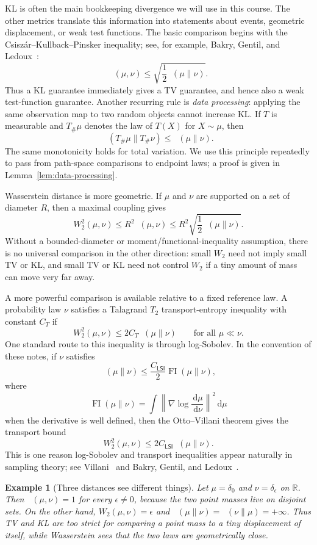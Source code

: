 \documentclass[10pt,a4paper]{amsart}
\numberwithin{equation}{section}
\newtheorem*{example}{Example}
\DeclareMathOperator{\KL}{D_{\mathsf{KL}}}
\DeclareMathOperator{\TV}{D_{\mathsf{TV}}}
\DeclareMathOperator{\FI}{FI}
\newcommand{\R}{\mathbb{R}}
\newcommand{\dd}{\,\mathrm{d}}
\newcommand{\norm}[1]{\left\lVert #1 \right\rVert}
\begin{document}
KL is often the main bookkeeping divergence we will use in this course.  The other metrics translate this information into statements
about events, geometric displacement, or weak test functions.
The basic comparison begins with the Csisz\'ar--Kullback--Pinsker inequality;
see, for example, Bakry, Gentil, and Ledoux~\cite{bakry2014analysis}:
\[
    \TV(\mu,\nu)
    \leq
    \sqrt{\frac12\KL(\mu\|\nu)}.
\]
Thus a KL guarantee immediately gives a TV guarantee, and hence also a weak
test-function guarantee.  Another recurring rule is \emph{data processing}:
applying the same observation map to two random objects cannot increase KL\@.  If
$T$ is measurable and $T_\#\mu$ denotes the law of $T(X)$ for $X\sim\mu$, then
\[
    \KL(T_\#\mu\|T_\#\nu)\leq \KL(\mu\|\nu).
\]
The same monotonicity holds for total variation.  We use this principle
repeatedly to pass from path-space comparisons to endpoint laws; a proof is
given in Lemma~\ref{lem:data-processing}.

Wasserstein distance is more geometric.  If $\mu$
and $\nu$ are supported on a set of diameter $R$, then a maximal coupling gives
\[
    W_2^2(\mu,\nu)
    \leq
    R^2\TV(\mu,\nu)
    \leq
    R^2\sqrt{\frac12\KL(\mu\|\nu)}.
\]
Without a bounded-diameter or moment/functional-inequality assumption, there
is no universal comparison in the other direction: small $W_2$ need not imply
small TV or KL, and small TV or KL need not control $W_2$ if a tiny amount of
mass can move very far away.

A more powerful comparison is available relative to a fixed reference law.  A
probability law $\nu$ satisfies a Talagrand $T_2$ transport-entropy inequality
with constant $C_T$ if
\[
    W_2^2(\mu,\nu)\leq 2C_T\KL(\mu\|\nu)
    \qquad\text{for all }\mu\ll\nu.
\]
One standard route to this inequality is through log-Sobolev.  In the convention
of these notes, if $\nu$ satisfies
\[
    \KL(\mu\|\nu)
    \leq
    \frac{C_{\mathsf{LSI}}}{2}\FI(\mu\|\nu),
\]
where
\[
    \FI(\mu\|\nu)
    =
    \int \norm{\nabla\log\frac{\dd\mu}{\dd\nu}}^2\dd\mu
\]
when the derivative is well defined, then the Otto--Villani theorem gives
the transport bound
\[
    W_2^2(\mu,\nu)\leq 2C_{\mathsf{LSI}}\KL(\mu\|\nu).
\]
This is one reason log-Sobolev and transport inequalities appear naturally in
sampling theory; see Villani~\cite{villani2009optimal} and Bakry, Gentil, and
Ledoux~\cite{bakry2014analysis}.

\begin{example}[Three distances see different things]
Let $\mu=\delta_0$ and $\nu=\delta_\epsilon$ on $\R$.  Then
$\TV(\mu,\nu)=1$ for every $\epsilon\neq0$, because the two point masses live
on disjoint sets.  On the other hand, $W_2(\mu,\nu)=\epsilon$ and
$\KL(\mu\|\nu)=\KL(\nu\|\mu)=+\infty$.  Thus TV and KL are too strict for
comparing a point mass to a tiny displacement of itself, while Wasserstein
sees that the two laws are geometrically close.
\end{example}
\end{document}
